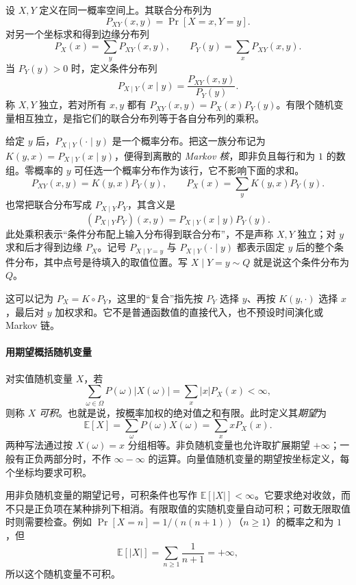 \documentclass[lang=cn,a4paper,fontset=none,zihao=false,10pt,openany,twoside]{beautybook}
\numberwithin{algorithm}{chapter}
\begin{document}
\begin{definition}\label{def:joint-conditional-distribution}
设 $X,Y$ 定义在同一概率空间上。其联合分布列为
\[
 P_{XY}(x,y)=\Pr[X=x,Y=y].
\]
对另一个坐标求和得到边缘分布列
\[
 P_X(x)=\sum_yP_{XY}(x,y),\qquad P_Y(y)=\sum_xP_{XY}(x,y).
\]
当 $P_Y(y)>0$ 时，定义条件分布列
\[
 P_{X\mid Y}(x\mid y)=\frac{P_{XY}(x,y)}{P_Y(y)}.
\]
称 $X,Y$ 独立，若对所有 $x,y$ 都有 $P_{XY}(x,y)=P_X(x)P_Y(y)$。有限个随机变量相互独立，是指它们的联合分布列等于各自分布列的乘积。
\end{definition}
给定 $y$ 后，$P_{X\mid Y}(\cdot\mid y)$ 是一个概率分布。把这一族分布记为 $K(y,x)=P_{X\mid Y}(x\mid y)$，便得到离散的 \emph{Markov 核}，即非负且每行和为 $1$ 的数组。零概率的 $y$ 可任选一个概率分布作为该行，它不影响下面的求和。
\[
 P_{XY}(x,y)=K(y,x)P_Y(y),\qquad
 P_X(x)=\sum_yK(y,x)P_Y(y).
\]
也常把联合分布写成 $P_{X\mid Y}P_Y$，其含义是
\[
 (P_{X\mid Y}P_Y)(x,y)=P_{X\mid Y}(x\mid y)P_Y(y).
\]
此处乘积表示“条件分布配上输入分布得到联合分布”，不是声称 $X,Y$ 独立；对 $y$ 求和后才得到边缘 $P_X$。记号 $P_{X\mid Y=y}$ 与 $P_{X\mid Y}(\cdot\mid y)$ 都表示固定 $y$ 后的整个条件分布，其中点号是待填入的取值位置。写 $X\mid Y=y\sim Q$ 就是说这个条件分布为 $Q$。

这可以记为 $P_X=K\circ P_Y$，这里的“复合”指先按 $P_Y$ 选择 $y$、再按 $K(y,\cdot)$ 选择 $x$，最后对 $y$ 加权求和。它不是普通函数值的直接代入，也不预设时间演化或 Markov 链。

\paragraph{用期望概括随机变量}
\begin{definition}[可积性与期望]\label{def:expectation}
对实值随机变量 $X$，若
\[
 \sum_{\omega\in\Omega}P(\omega)|X(\omega)|
 =\sum_x|x|P_X(x)<\infty,
\]
则称 $X$ \emph{可积}。也就是说，按概率加权的绝对值之和有限。此时定义其\emph{期望}为
\[
 \mathbb E[X]=\sum_\omega P(\omega)X(\omega)=\sum_x xP_X(x).
\]
两种写法通过按 $X(\omega)=x$ 分组相等。非负随机变量也允许取扩展期望 $+\infty$；一般有正负两部分时，不作 $\infty-\infty$ 的运算。向量值随机变量的期望按坐标定义，每个坐标均要求可积。
\end{definition}
用非负随机变量的期望记号，可积条件也写作 $\mathbb E[|X|]<\infty$。它要求绝对收敛，而不只是正负项在某种排列下相消。有限取值的实随机变量自动可积；可数无限取值时则需要检查。例如 $\Pr[X=n]=1/(n(n+1))$（$n\ge1$）的概率之和为 $1$，但
\[
 \mathbb E[|X|]=\sum_{n\ge1}\frac1{n+1}=+\infty,
\]
所以这个随机变量不可积。
\end{document}
